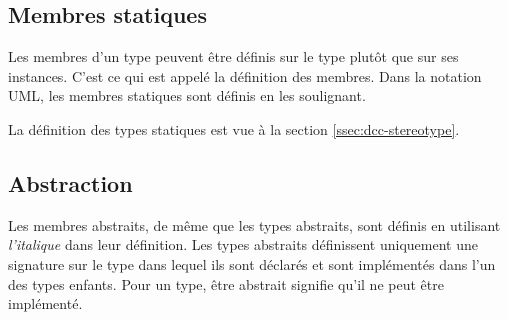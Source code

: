 \subsection{Membres statiques}
Les membres d'un type peuvent être définis sur le type plutôt que sur ses instances. C'est ce qui est appelé la définition  des membres. Dans la notation \acrshort{UML}, les membres statiques sont définis en les soulignant. 

La définition des types statiques est vue à la section \ref{ssec:dcc-stereotype}.

\subsection{Abstraction}

Les membres abstraits, de même que les types abstraits, sont définis en utilisant {\itshape l'italique} dans leur définition. Les types abstraits définissent uniquement une signature sur le type dans lequel ils sont déclarés et sont implémentés dans l'un des types enfants. Pour un type, être abstrait signifie qu'il ne peut être implémenté.

